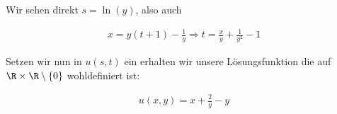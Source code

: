 \begin{solution}
Wir sehen direkt $ s = \ln(y)$, also auch

\begin{align*}
  x = y(t+1) - \frac{1}{y}
  \Rightarrow
  t = \frac{x}{y} + \frac{1}{y^2} - 1
\end{align*}

Setzen wir nun in $u(s,t)$ ein erhalten wir unsere Lösungsfunktion die auf
$\R \times \R \setminus \{0 \}$ wohldefiniert ist:

\begin{align*}
  u(x,y) = x + \frac{2}{y} - y
\end{align*}
\end{solution}
